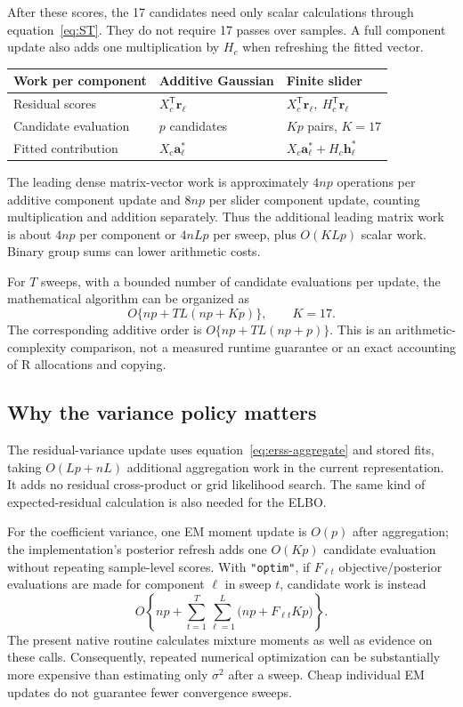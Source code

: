 \documentclass[11pt]{article}
\newcommand{\T}{^{\mathsf T}}
\begin{document}
After these scores, the 17 candidates need only scalar calculations
through equation~\eqref{eq:ST}. They do not require 17 passes over samples.
A full component update also adds one multiplication by $H_c$ when
refreshing the fitted vector.
\begin{center}
\small
\begin{tabular}{@{}p{}p{}p{}@{}}
\toprule
Work per component & Additive Gaussian & Finite slider\\
\midrule
Residual scores & $X_c\T\mathbf r_\ell$ &
 $X_c\T\mathbf r_\ell,\ H_c\T\mathbf r_\ell$\\[0.3em]
Candidate evaluation & $p$ candidates & $Kp$ pairs, $K=17$\\[0.3em]
Fitted contribution & $X_c\mathbf a_\ell^*$ &
 $X_c\mathbf a_\ell^*+H_c\mathbf h_\ell^*$\\
\bottomrule
\end{tabular}
\end{center}
The leading dense matrix-vector work is approximately $4np$ operations
per additive component update and $8np$ per slider component update,
counting multiplication and addition separately. Thus the additional
leading matrix work is about $4np$ per component or $4nLp$ per sweep,
plus $O(KLp)$ scalar work. Binary group sums can lower arithmetic costs.

For $T$ sweeps, with a bounded number of candidate evaluations per update,
the mathematical algorithm can be organized as
\begin{equation}
 O\{np+TL(np+Kp)\},\qquad K=17.
 \label{eq:cost}
\end{equation}
The corresponding additive order is $O\{np+TL(np+p)\}$. This is an
arithmetic-complexity comparison, not a measured runtime guarantee or
an exact accounting of R allocations and copying.

\subsection{Why the variance policy matters}
The residual-variance update uses equation~\eqref{eq:erss-aggregate}
and stored fits, taking $O(Lp+nL)$ additional aggregation work in the
current representation. It adds no residual cross-product or grid
likelihood search. The same kind of expected-residual calculation is
also needed for the ELBO.

For the coefficient variance, one EM moment update is $O(p)$ after
aggregation; the implementation's posterior refresh adds one $O(Kp)$
candidate evaluation without repeating sample-level scores. With
\texttt{"optim"}, if $F_{\ell t}$ objective/posterior evaluations are
made for component $\ell$ in sweep $t$, candidate work is instead
\begin{equation}
 O\left\{np+\sum_{t=1}^T\sum_{\ell=1}^L
              \bigl(np+F_{\ell t}Kp\bigr)\right\}.
 \label{eq:optim-cost}
\end{equation}
The present native routine calculates mixture moments as well as evidence
on these calls. Consequently, repeated numerical optimization can be
substantially more expensive than estimating only $\sigma^2$ after a sweep.
Cheap individual EM updates do not guarantee fewer convergence sweeps.
\end{document}
